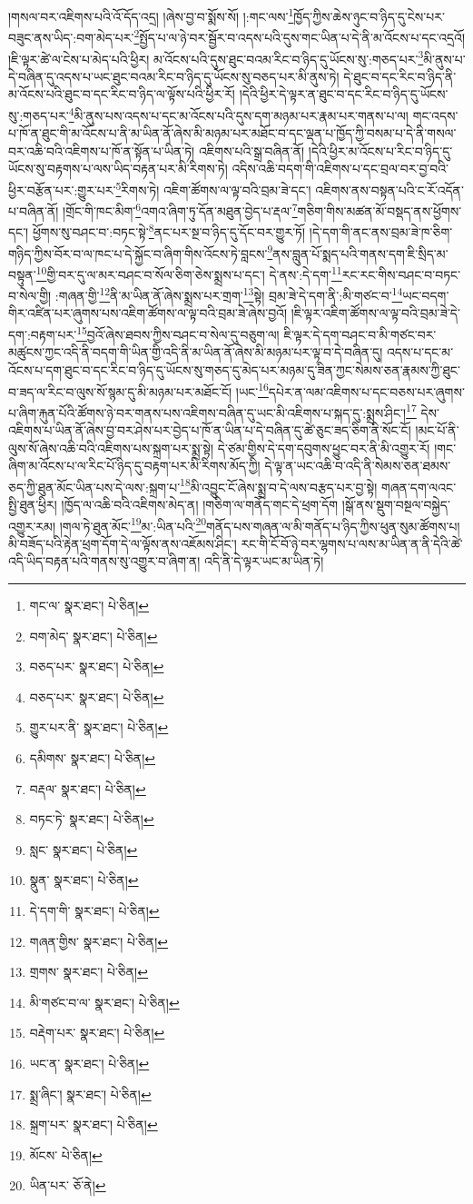 །གསལ་བར་འཇིགས་པའི་འོ་དོད་འདྲ། །ཞེས་བྱ་བ་སྨོས་སོ། །:གང་ལས་\footnote{གང་ལ་  སྣར་ཐང་།  པེ་ཅིན། }ཁྱོད་ཀྱིས་ཆེས་ཉུང་བ་ཉིད་དུ་ངེས་པར་བཟུང་ནས་ཡིད་:བག་མེད་པར་\footnote{བག་མེད་  སྣར་ཐང་།  པེ་ཅིན། }སྤྱོད་པ་ལ་ཉེ་བར་སྦྱོར་བ་འདས་པའི་དུས་གང་ཡིན་པ་དེ་ནི་མ་འོངས་པ་དང་འདྲའོ། །ཇི་ལྟར་ཚེ་ལ་ངེས་པ་མེད་པའི་ཕྱིར། མ་འོངས་པའི་དུས་ཐུང་བའམ་རིང་བ་ཉིད་དུ་ཡོངས་སུ་:གཅད་པར་\footnote{བཅད་པར་  སྣར་ཐང་།  པེ་ཅིན། }མི་ནུས་པ་དེ་བཞིན་དུ་འདས་པ་ཡང་ཐུང་བའམ་རིང་བ་ཉིད་དུ་ཡོངས་སུ་བཅད་པར་མི་ནུས་ཏེ། དེ་ཐུང་བ་དང་རིང་བ་ཉིད་ནི་མ་འོངས་པའི་ཐུང་བ་དང་རིང་བ་ཉིད་ལ་ལྟོས་པའི་ཕྱིར་རོ། །དེའི་ཕྱིར་དེ་ལྟར་ན་ཐུང་བ་དང་རིང་བ་ཉིད་དུ་ཡོངས་སུ་:གཅད་པར་\footnote{བཅད་པར་  སྣར་ཐང་།  པེ་ཅིན། }མི་ནུས་པས་འདས་པ་དང་མ་འོངས་པའི་དུས་དག་མཉམ་པར་རྣམ་པར་གནས་པ་ལ། གང་འདས་པ་ཁོ་ན་ཐུང་གི་མ་འོངས་པ་ནི་མ་ཡིན་ནོ་ཞེས་མི་མཉམ་པར་མཐོང་བ་དང་ལྡན་པ་ཁྱོད་ཀྱི་བསམ་པ་དེ་ནི་གསལ་བར་འཆི་བའི་འཇིགས་པ་ཁོ་ན་སྟོན་པ་ཡིན་ཏེ། འཇིགས་པའི་སྒྲ་བཞིན་ནོ། །དེའི་ཕྱིར་མ་འོངས་པ་རིང་བ་ཉིད་དུ་ཡོངས་སུ་བརྟགས་པ་ལས་ཡིད་བརྟན་པར་མི་རིགས་ཏེ། འདིས་འཆི་བདག་གི་འཇིགས་པ་དང་བྲལ་བར་བྱ་བའི་ཕྱིར་བརྩོན་པར་:གྱུར་པར་\footnote{གྱུར་པར་ནི་  སྣར་ཐང་།  པེ་ཅིན། }རིགས་ཏེ། འཇིག་ཚོགས་ལ་ལྟ་བའི་བྲམ་ཟེ་དང་། འཇིགས་ནས་བསྟན་པའི་ང་རོ་འདོན་པ་བཞིན་ནོ། །གྲོང་གི་ཁང་མིག་\footnote{དམིགས་  སྣར་ཐང་།  པེ་ཅིན། }འགའ་ཞིག་ཏུ་དོན་མཐུན་བྱེད་པ་རྡལ་\footnote{བརྡལ་  སྣར་ཐང་།  པེ་ཅིན། }གཅིག་གིས་མཚན་མོ་བསྡད་ནས་ཕྱོགས་དང་། ཕྱོགས་སུ་བཤང་བ་:བཏང་སྟེ་\footnote{བཏང་ཏེ་  སྣར་ཐང་།  པེ་ཅིན། }ནང་པར་སྔ་བ་ཉིད་དུ་དོང་བར་གྱུར་ཏོ། །དེ་དག་གི་ནང་ནས་བྲམ་ཟེ་ཁ་ཅིག་གཉིད་ཀྱིས་བོར་བ་ལ་ཁང་པ་དེ་སྐྱོང་བ་ཞིག་གིས་འོངས་ཏེ་བླངས་\footnote{སླང་  སྣར་ཐང་།  པེ་ཅིན། }ནས་བླུན་པོ་སྨད་པའི་གནས་དག་ཇི་སྲིད་མ་བསྟུན་\footnote{སྣུན་  སྣར་ཐང་།  པེ་ཅིན། }གྱི་བར་དུ་ལ་མར་བཤང་བ་སོལ་ཅིག་ཅེས་སྨྲས་པ་དང་། དེ་ནས་:དེ་དག་\footnote{དེ་དག་གི་  སྣར་ཐང་།  པེ་ཅིན། }རང་རང་གིས་བཤང་བ་བཏང་བ་སེལ་གྱི། :གཞན་གྱི་\footnote{གཞན་གྱིས་  སྣར་ཐང་།  པེ་ཅིན། }ནི་མ་ཡིན་ནོ་ཞེས་སྨྲས་པར་གྲག་\footnote{གྲགས་  སྣར་ཐང་།  པེ་ཅིན། }སྟེ། བྲམ་ཟེ་དེ་དག་ནི་:མི་གཙང་བ་\footnote{མི་གཙང་བ་ལ་  སྣར་ཐང་།  པེ་ཅིན། }ཡང་བདག་གིར་འཛིན་པར་ཞུགས་པས་འཇིག་ཚོགས་ལ་ལྟ་བའི་བྲམ་ཟེ་ཞེས་བྱའོ། །ཇི་ལྟར་འཇིག་ཚོགས་ལ་ལྟ་བའི་བྲམ་ཟེ་དེ་དག་:བརྟག་པར་\footnote{བརྡེག་པར་  སྣར་ཐང་།  པེ་ཅིན། }བྱའོ་ཞེས་ཐབས་ཀྱིས་བཤང་བ་སེལ་དུ་བཅུག་ལ། ཇི་ལྟར་དེ་དག་བཤང་བ་མི་གཙང་བར་མཚུངས་ཀྱང་འདི་ནི་བདག་གི་ཡིན་གྱི་འདི་ནི་མ་ཡིན་ནོ་ཞེས་མི་མཉམ་པར་ལྟ་བ་དེ་བཞིན་དུ། འདས་པ་དང་མ་འོངས་པ་དག་ཐུང་བ་དང་རིང་བ་ཉིད་དུ་ཡོངས་སུ་གཅད་དུ་མེད་པར་མཉམ་དུ་ཟིན་ཀྱང་སེམས་ཅན་རྣམས་ཀྱི་ཐུང་བ་ཟད་ལ་རིང་བ་ལུས་སོ་སྙམ་དུ་མི་མཉམ་པར་མཐོང་ངོ། །ཡང་\footnote{ཡང་ན་  སྣར་ཐང་།  པེ་ཅིན། }དཔེར་ན་ལམ་འཇིགས་པ་དང་བཅས་པར་ཞུགས་པ་ཞིག་རྐུན་པོའི་ཚོགས་ཉེ་བར་གནས་པས་འཇིགས་བཞིན་དུ་ཡང་མི་འཇིགས་པ་སྐད་དུ་:སྨྲས་ཤིང་།\footnote{སྨྲ་ཞིང་།  སྣར་ཐང་།  པེ་ཅིན། } དེས་འཇིགས་པ་ཡིན་ནོ་ཞེས་བྱ་བར་ཤེས་པར་བྱེད་པ་ཁོ་ན་ཡིན་པ་དེ་བཞིན་དུ་ཚེ་ཅུང་ཟད་ཅིག་ནི་སོང་ངོ། །མང་པོ་ནི་ལུས་སོ་ཞེས་འཆི་བའི་འཇིགས་པས་སྐྲག་པར་སྨྲ་སྟེ། དེ་ཙམ་གྱིས་དེ་དག་དབུགས་ཕྱུང་བར་ནི་མི་འགྱུར་རོ། །གང་ཞིག་མ་འོངས་པ་ལ་རིང་པོ་ཉིད་དུ་བརྟག་པར་མི་རིགས་མོད་ཀྱི། དེ་ལྟ་ན་ཡང་འཆི་བ་འདི་ནི་སེམས་ཅན་ཐམས་ཅད་ཀྱི་ཐུན་མོང་ཡིན་པས་དེ་ལས་:སྐྲག་པ་\footnote{སྐྲག་པར་  སྣར་ཐང་།  པེ་ཅིན། }མི་འབྱུང་ངོ་ཞེས་སྨྲ་བ་དེ་ལས་བརྩད་པར་བྱ་སྟེ། གཞན་དག་ལའང་སྤྱི་ཐུན་ཕྱིར། །ཁྱོད་ལ་འཆི་བའི་འཇིགས་མེད་ན། །གཅིག་ལ་གནོད་གང་དེ་ཕྲག་དོག །སྒོ་ནས་སྡུག་བསྔལ་བསྐྱེད་འགྱུར་རམ། །གལ་ཏེ་ཐུན་མོང་\footnote{མོངས་  པེ་ཅིན། }མ་:ཡིན་པའི་\footnote{ཡིན་པར་  ཅོ་ནེ། }གནོད་པས་གཞན་ལ་མི་གནོད་པ་ཉིད་ཀྱིས་ཕུན་སུམ་ཚོགས་པ། མི་བཟོད་པའི་རྟེན་ཕྲག་དོག་དེ་ལ་ལྟོས་ནས་འཇོམས་ཤིང་། རང་གི་ངོ་བོ་ཉེ་བར་ལྷགས་པ་ལས་མ་ཡིན་ན་ནི་དེའི་ཚེ་འདི་ཡིད་བརྟན་པའི་གནས་སུ་འགྱུར་བ་ཞིག་ན། འདི་ནི་དེ་ལྟར་ཡང་མ་ཡིན་ཏེ། 